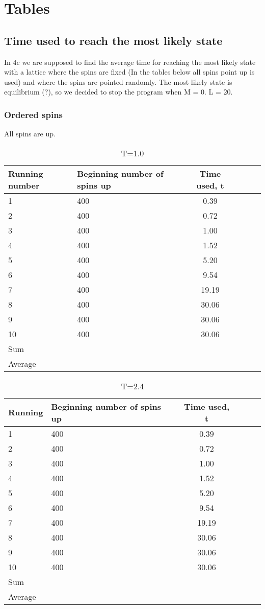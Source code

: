 \documentclass[norsk,a4paper,12pt]{article}
\begin{document}
\section{Tables} 
\subsection{Time used to reach the most likely state}
In 4c we are supposed to find the average time for reaching the most likely state with a lattice where the spins are fixed (In the tables below all spins point up is used) and where the spins are pointed randomly. The most likely state is equilibrium (?), so we decided to stop the program when M = 0. L = 20.
\subsubsection{Ordered spins}
All spins are up.
\begin{table}[H]
\centering
\caption{T=1.0}
\label{tab:orderedT=1} 
\begin{tabularx}{\textwidth}{XlcXrX}
\toprule
Running number  & Beginning number of spins up  & Time used, t \\
\midrule
1	& 400  & 0.39    \\
2   & 400  & 0.72    \\
3   & 400  & 1.00    \\
4   & 400  & 1.52    \\
5   & 400  & 5.20    \\
6 	& 400  & 9.54    \\
7 	& 400  & 19.19   \\
8   & 400  & 30.06   \\
9   & 400  & 30.06   \\
10  & 400  & 30.06   \\
\midrule
Sum && \\
Average && \\
\bottomrule
\end{tabularx}
\end{table}
\begin{table}[H]
\centering
\caption{T=2.4}
\label{tab:orderedT=2.4} 
\begin{tabularx}{\textwidth}{XlcXrX}
\toprule
Running  & Beginning number of spins up & Time used, t \\
\midrule
1	& 400  & 0.39    \\
2   & 400  & 0.72    \\
3   & 400  & 1.00    \\
4   & 400  & 1.52    \\
5   & 400  & 5.20    \\
6 	& 400  & 9.54    \\
7 	& 400  & 19.19   \\
8   & 400  & 30.06   \\
9   & 400  & 30.06   \\
10  & 400  & 30.06   \\
\midrule
Sum && \\
Average && \\
\bottomrule
\end{tabularx}
\end{table}
\end{document}
